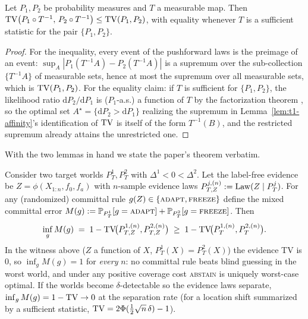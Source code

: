 \begin{lemma}\label{lem:t1-dpi}
Let $P_1,P_2$ be probability measures and $T$ a measurable map. Then
$\TV\bigl(P_1\circ T^{-1},\,P_2\circ T^{-1}\bigr)\le\TV(P_1,P_2)$, with
equality whenever $T$ is a sufficient statistic for the pair
$\{P_1,P_2\}$.
\end{lemma}

\begin{proof}
For the inequality, every event of the pushforward laws is the preimage of
an event: $\sup_A|P_1(T^{-1}A)-P_2(T^{-1}A)|$ is a supremum over the
sub-collection $\{T^{-1}A\}$ of measurable sets, hence at most the
supremum over all measurable sets, which is $\TV(P_1,P_2)$. For the
equality claim: if $T$ is sufficient for $\{P_1,P_2\}$, the likelihood
ratio $\mathrm dP_2/\mathrm dP_1$ is ($P_1$-a.s.) a function of $T$ by the
factorization theorem \cite{lehmann2005testing}, so the optimal set
$A^\star=\{\mathrm dP_2>\mathrm dP_1\}$ realizing the supremum in
Lemma~\ref{lem:t1-affinity}'s identification of $\TV$ is itself of the
form $T^{-1}(B)$, and the restricted supremum already attains the
unrestricted one.
\end{proof}

With the two lemmas in hand we state the paper's theorem verbatim.

\begin{theorem}
\label{thm:t1-impquant}\label{thm:imp-quant}
Consider two target worlds $P_T^1,P_T^2$ with $\Delta^1<0<\Delta^2$. Let the
label-free evidence be $Z=\phi(X_{1:n},f_0,f_a)$ with $n$-sample evidence
laws $P_{T,Z}^{j,(n)}:=\Law(Z\mid P_T^j)$. For any (randomized) committal
rule $g(Z)\in\{\textsc{adapt},\textsc{freeze}\}$ define the mixed committal
error $M(g):=\Pr_{P_T^1}[g=\textsc{adapt}]+\Pr_{P_T^2}[g=\textsc{freeze}]$.
Then
\[
\inf_{g} M(g)\;=\;1-\TV\!\big(P_{T,Z}^{1,(n)},P_{T,Z}^{2,(n)}\big)\;\ge\;1-\TV\!\big(P_T^{1,(n)},P_T^{2,(n)}\big).
\]
In the witness above ($Z$ a function of $X$, $P_T^1(X)=P_T^2(X)$) the
evidence TV is $0$, so $\inf_g M(g)=1$ for \emph{every} $n$: no committal
rule beats blind guessing in the worst world, and under any positive
coverage cost \textsc{abstain} is uniquely worst-case optimal. If the
worlds become $\delta$-detectable so the evidence laws separate,
$\inf_g M(g)=1-\TV\to0$ at the separation rate (for a location shift
summarized by a sufficient statistic, $\TV=2\Phi(\tfrac12\sqrt n\,\delta)-1$).
\end{theorem}

